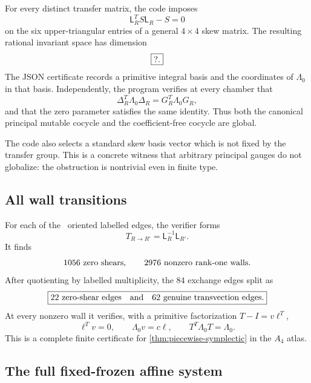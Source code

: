 For every distinct transfer matrix, the code imposes
\[
 \mathsf L_R^TS\mathsf L_R-S=0
\]
on the six upper-triangular entries of a general $4\times4$ skew matrix.  The
resulting rational invariant space has dimension
\begin{equation}
 \boxed{?.}
 \label{eq:A4-invariant-dimension}
\end{equation}
The JSON certificate records a primitive integral basis and the coordinates
of $\Lambda_0$ in that basis.  Independently, the program verifies at every
chamber that
\begin{equation}
 \Delta_R^T\Lambda_0\Delta_R
 =G_R^T\Lambda_0G_R,
 \label{eq:A4-global-Lambda}
\end{equation}
and that the zero parameter satisfies the same identity.  Thus both the
canonical principal mutable cocycle and the coefficient-free cocycle are
global.

The code also selects a standard skew basis vector which is not fixed by the
transfer group.  This is a concrete witness that arbitrary principal gauges
do not globalize: the obstruction is nontrivial even in finite type.

\subsection{All wall transitions}

For each of the \AIVOrientedMutations\ oriented labelled edges, the verifier
forms
\[
 T_{R\to R'}=\mathsf L_R^{-1}\mathsf L_{R'}.
\]
It finds
\[
 1056\text{ zero shears},
 \qquad
 2976\text{ nonzero rank-one walls}.
\]
After quotienting by labelled multiplicity, the $84$ exchange edges split as
\begin{equation}
 \boxed{
 22\text{ zero-shear edges}
 \quad\text{and}\quad
 62\text{ genuine transvection edges}.}
 \label{eq:A4-wall-counts}
\end{equation}
At every nonzero wall it verifies, with a primitive factorization
$T-I=v\ell^T$,
\[
 \ell^Tv=0,
 \qquad
 \Lambda_0v=c\ell,
 \qquad
 T^T\Lambda_0T=\Lambda_0.
\]
This is a complete finite certificate for
\cref{thm:piecewise-symplectic} in the $A_4$ atlas.

\subsection{The full fixed-frozen affine system}

